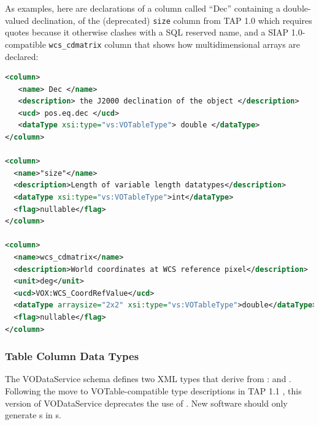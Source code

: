 \documentclass[11pt,a4paper]{ivoa}
\begin{document}
As examples, here are declarations of a column called ``Dec'' containing
a double-valued declination, of the (deprecated) \verb|size| column
from TAP 1.0 which requires quotes because it otherwise clashes with a
SQL reserved name, and a SIAP 1.0-compatible \verb|wcs_cdmatrix|
column that shows how multidimensional arrays are declared:

\begin{lstlisting}[language=XML]
<column>
   <name> Dec </name>
   <description> the J2000 declination of the object </description>
   <ucd> pos.eq.dec </ucd>
   <dataType xsi:type="vs:VOTableType"> double </dataType>
</column>

<column>
  <name>"size"</name>
  <description>Length of variable length datatypes</description>
  <dataType xsi:type="vs:VOTableType">int</dataType>
  <flag>nullable</flag>
</column>

<column>
  <name>wcs_cdmatrix</name>
  <description>World coordinates at WCS reference pixel</description>
  <unit>deg</unit>
  <ucd>VOX:WCS_CoordRefValue</ucd>
  <dataType arraysize="2x2" xsi:type="vs:VOTableType">double</dataType>
  <flag>nullable</flag>
</column>
\end{lstlisting}


\subsubsection{Table Column Data Types}
\label{sect:tbldatatypes}


The VODataService schema defines two XML types that derive from
:   and
.  Following the move to VOTable-compatible type
descriptions in TAP 1.1 \citep{todo:TAP1.1}, this version of
VODataService deprecates the use of .  New software
should only generate s in s.
\end{document}
